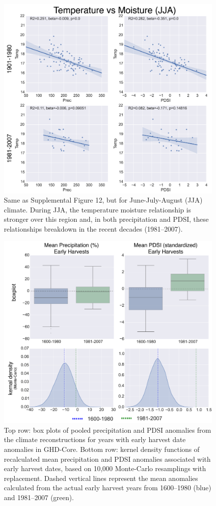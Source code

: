 \documentclass[12pt]{article}
\begin{document}
\begin{figure}
\center
\includegraphics[width=1.0\columnwidth,scale=2]{SUPP_fig_14_temp_vs_moist_JJA.png}
\caption{Same as Supplemental Figure 12, but for June-July-August (JJA) climate. During JJA, the temperature moisture relationship is stronger over this region and, in both precipitation and PDSI, these relationships breakdown in the recent decades (1981--2007).}
\end{figure}

\begin{figure}
\center
\includegraphics[width=1.0\columnwidth,scale=2]{SUPP_fig_15_JJA_boxplot_monte.png}
\caption{Top row: box plots of pooled precipitation and PDSI anomalies from the climate reconstructions for years with early harvest date anomalies in GHD-Core. Bottom row: kernel density functions of recalculated mean precipitation and PDSI anomalies associated with early harvest dates, based on 10,000 Monte-Carlo resamplings with replacement. Dashed vertical lines represent the mean anomalies calculated from the actual early harvest years from 1600--1980 (blue) and 1981--2007 (green).}
\end{figure}
\end{document}

